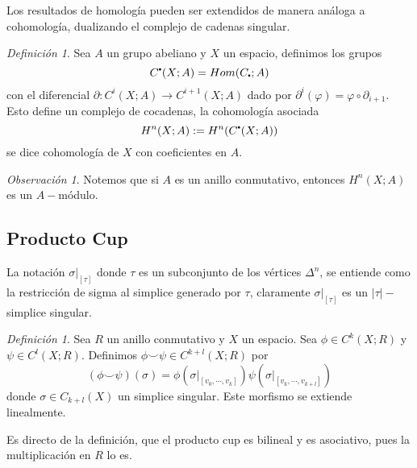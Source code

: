 \documentclass[aop]{imsart2}
\theoremstyle{plain}
\theoremstyle{remark}
\newtheorem{dfn}[teo]{Definición}
\newtheorem*{obs}{Observación}
\newcommand{\abs}[1]{\left|#1 \right|}
\newcommand\sbullet[1][.5]{\mathbin{\vcenter{\hbox{\scalebox{#1}{$\bullet$}}}}}
\begin{document}
\noindent Los resultados de homología pueden ser extendidos de manera análoga a cohomología, 
dualizando el complejo de cadenas singular.

\begin{dfn}
    Sea $A$ un grupo abeliano y $X$ un espacio, definimos los grupos
    \begin{equation*}
        C^{\sbullet}(X;A)=Hom(C_{\sbullet};A)
    \end{equation*}
    con el diferencial $\partial:C^{i}(X;A)\to C^{i+1}(X;A)$ dado por $\partial^{i}(\varphi)
    =\varphi\circ\partial_{i+1}$. Esto define un complejo de cocadenas, la cohomología asociada
    \begin{equation*}
        H^{n}(X;A):=H^{n}(C^{\sbullet}(X;A))
    \end{equation*}
    se dice cohomología de $X$ con coeficientes en $A$.
\end{dfn}

\begin{obs}
    Notemos que si $A$ es un anillo conmutativo, entonces $H^{n}(X;A)$ es un $A-$módulo.
\end{obs}

\subsection{Producto Cup} \hspace{2mm}

\vspace{2mm}
\noindent La notación $\sigma|_{[\tau]}$ donde $\tau$ es un subconjunto de los vértices 
$\Delta^{n}$, se entiende como la restricción de sigma al simplice generado por $\tau$, claramente
$\sigma|_{[\tau]}$ es un $\abs{\tau}-$simplice singular.

\begin{dfn}
    Sea $R$ un anillo conmutativo y $X$ un espacio. Sea $\phi\in C^{k}(X;R)$ y 
    $\psi\in C^{l}(X;R)$. Definimos $\phi\smile\psi\in C^{k+l}(X;R)$ por
    \begin{equation*}
        (\phi\smile\psi)(\sigma)
        =\phi(\sigma|_{[v_{0},\cdots,v_{k}]})\psi(\sigma|_{[v_{k},\cdots,v_{k+l}]})
    \end{equation*}
    donde $\sigma\in C_{k+l}(X)$ un simplice singular. Este morfismo se extiende linealmente.
\end{dfn}

\noindent Es directo de la definición, que el producto cup es bilineal y es asociativo, pues la
multiplicación en $R$ lo es.
\end{document}

